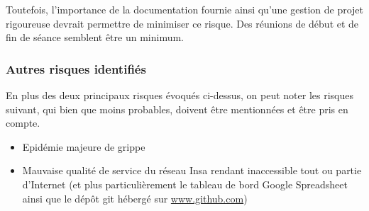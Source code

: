 Toutefois, l'importance de la documentation fournie ainsi qu'une gestion de
projet rigoureuse devrait permettre de minimiser ce risque. Des réunions de
début et de fin de séance semblent être un minimum.


\subsubsection{Autres risques identifiés}

En plus des deux principaux risques évoqués ci-dessus, on peut noter les
risques suivant, qui bien que moins probables, doivent être mentionnées et
être pris en compte.

\begin{itemize}

\item Epidémie majeure de grippe
\item Mauvaise qualité de service du réseau Insa rendant inaccessible tout
ou partie d'Internet (et plus particulièrement le tableau de bord Google
Spreadsheet ainsi que le dépôt git hébergé sur \url{www.github.com})

\end{itemize}


\vfill
\pagebreak
